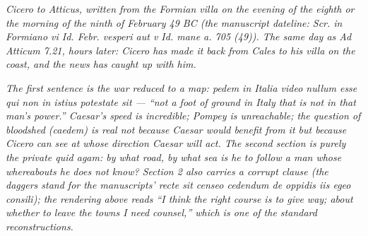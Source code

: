 
\textit{Cicero to Atticus, written from the Formian
villa on the evening of the eighth or the morning of
the ninth of February 49 BC (the manuscript dateline:
\textit{Scr. in Formiano vi Id. Febr. vesperi aut v
Id. mane a. 705 (49)}). The same day as \emph{Ad
Atticum} 7.21, hours later: Cicero has made it back
from Cales to his villa on the coast, and the news has
caught up with him.}

\textit{The first sentence is the war reduced to a
map: \emph{pedem in Italia video nullum esse qui non
in istius potestate sit} --- ``not a foot of ground in
Italy that is not in that man's power.'' Caesar's
speed is incredible; Pompey is unreachable; the
question of bloodshed (\emph{caedem}) is real not
because Caesar would benefit from it but because
Cicero can see at whose direction Caesar will act. The
second section is purely the private \emph{quid agam}:
by what road, by what sea is he to follow a man whose
whereabouts he does not know? Section 2 also carries
a corrupt clause (the daggers stand for the
manuscripts' \emph{recte sit censeo cedendum de oppidis
iis egeo consili}); the rendering above reads ``I
think the right course is to give way; about whether
to leave the towns I need counsel,'' which is one of
the standard reconstructions.}
